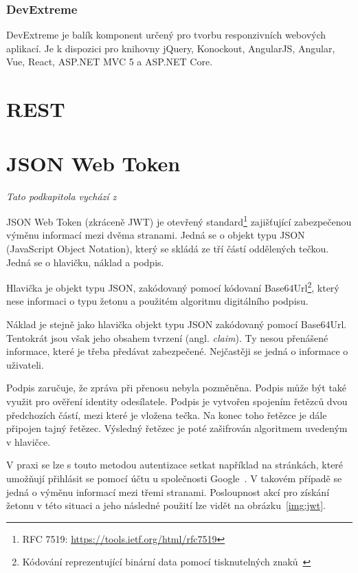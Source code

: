 \subsubsection{DevExtreme}
DevExtreme je balík komponent určený pro tvorbu responzivních webových aplikací. Je k dispozici pro knihovny jQuery, Konockout, AngularJS, Angular, Vue, React, ASP.NET MVC 5 a ASP.NET Core.  
\blindtext

\section{REST}
\blindtext[2]

\section{JSON Web Token}
\emph{Tato podkapitola vychází z~\cite{bib:jwt}}

JSON Web Token (zkráceně JWT) je otevřený standard\footnote{RFC 7519: \url{https://tools.ietf.org/html/rfc7519}} zajišťující zabezpečenou výměnu informací mezi dvěma stranami. Jedná se o objekt typu JSON (JavaScript Object Notation), který se skládá ze tří částí oddělených tečkou. Jedná se o hlavičku, náklad a podpis.

Hlavička je objekt typu JSON, zakódovaný pomocí kódovaní Base64Url\footnote{Kódování reprezentující binární data pomocí tisknutelných znaků~\cite{bib:base64}}, který nese informaci o typu žetonu a použitém algoritmu digitálního podpisu. 

Náklad je stejně jako hlavička objekt typu JSON zakódovaný pomocí Base64Url. Tentokrát jsou však jeho obsahem tvrzení (angl. \emph{claim}). Ty nesou přenášené informace, které je třeba předávat zabezpečené. Nejčastěji se jedná o informace o uživateli.

Podpis zaručuje, že zpráva při přenosu nebyla pozměněna. Podpis může být také využit pro ověření identity odesílatele. Podpis je vytvořen spojením řetězců dvou předchozích částí, mezi které je vložena tečka. Na konec toho řetězce je dále připojen tajný řetězec. Výsledný řetězec je poté zašifrován algoritmem uvedeným v hlavičce. 

V praxi se lze s touto metodou autentizace setkat například na stránkách, které umožňují přihlásit se pomocí účtu u společnosti Google~\cite{bib:google-jwt}. V takovém případě se jedná o výměnu informací mezi třemi stranami. Posloupnost akcí pro získání žetonu v této situaci a jeho následné použití lze vidět na obrázku~\ref{img:jwt}.

